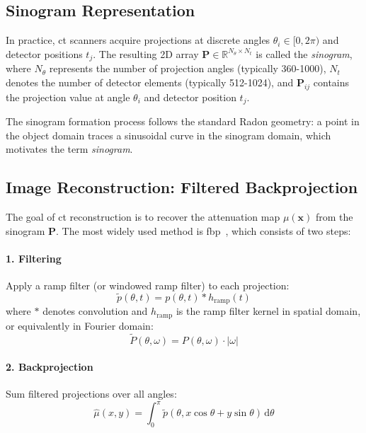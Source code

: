 \subsection{Sinogram Representation}

In practice, \gls{ct} scanners acquire projections at discrete angles $\theta_i \in [0, 2\pi)$ and detector positions $t_j$. The resulting 2D array $\mathbf{P} \in \mathbb{R}^{N_\theta \times N_t}$ is called the \textit{sinogram}, where $N_\theta$ represents the number of projection angles (typically 360-1000), $N_t$ denotes the number of detector elements (typically 512-1024), and $\mathbf{P}_{ij}$ contains the projection value at angle $\theta_i$ and detector position $t_j$.

The sinogram formation process follows the standard Radon geometry: a point in the object domain traces a sinusoidal curve in the sinogram domain, which motivates the term \textit{sinogram}.

\subsection{Image Reconstruction: Filtered Backprojection}

The goal of \gls{ct} reconstruction is to recover the attenuation map $\mu(\mathbf{x})$ from the sinogram $\mathbf{P}$. The most widely used method is \gls{fbp}~\cite{kak2001principles}, which consists of two steps:

\paragraph{1. Filtering} Apply a ramp filter (or windowed ramp filter) to each projection:
%
\begin{equation}
\tilde{p}(\theta, t) = p(\theta, t) \ast h_{\text{ramp}}(t)
\end{equation}
%
where $\ast$ denotes convolution and $h_{\text{ramp}}$ is the ramp filter kernel in spatial domain, or equivalently in Fourier domain:
%
\begin{equation}
\tilde{P}(\theta, \omega) = P(\theta, \omega) \cdot |\omega|
\end{equation}

\paragraph{2. Backprojection} Sum filtered projections over all angles:
%
\begin{equation}
\hat{\mu}(x, y) = \int_0^{\pi} \tilde{p}(\theta, x\cos\theta + y\sin\theta) \, \mathrm{d}\theta
\end{equation}

